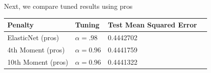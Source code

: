 \documentclass[article]{jss}
\numberwithin{equation}{section}
\begin{document}
Next, we compare tuned results using pros

\begin{center}
\setlength{\tabcolsep}{20pt} %
\renewcommand{\arraystretch}{1} %
\begin{tabular}{lllp{7.4cm}}
\hline
Penalty & Tuning & Test Mean Squared Error \\ \hline
ElasticNet (pros) & $\alpha = .98$ & 0.4442702 \\
4th Moment (pros) & $\alpha = 0.96$ &  0.4441759 \\
10th Moment (pros) & $\alpha = 0.96$ &  0.4441322 \\ \hline
\end{tabular}
\end{center}



\end{document}
